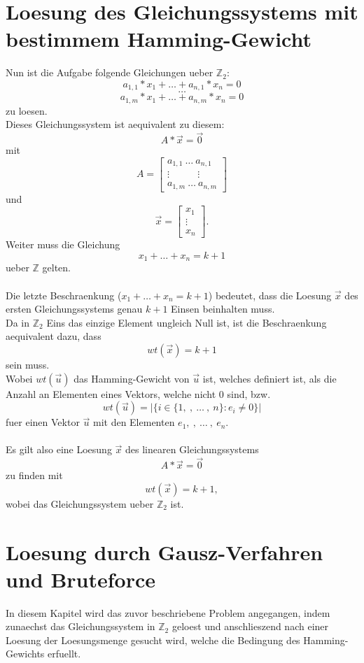 \documentclass[a4paper,10pt,ngerman]{scrartcl}
\begin{document}
\section{Loesung des Gleichungssystems mit bestimmem Hamming-Gewicht}
Nun ist die Aufgabe folgende Gleichungen ueber \(\mathbb{Z}_{2}\):
\[a_{1, 1} * x_1 + \dots + a_{n, 1} * x_n = 0\]
\[\dots\]
\[a_{1, m} * x_1 + \dots + a_{n, m}  * x_n = 0\]
zu loesen.\\
Dieses Gleichungssystem ist aequivalent zu diesem:
\[A * \vec{x} = \vec{0}\]
mit
\[A = \begin{bmatrix}
           a_{1, 1} \ \dots \ a_{n, 1} \\
           \vdots \ \ \ \ \ \ \ \ \ \ \ \ \ \vdots \\
           a_{1, m} \ \dots \ a_{n, m}
         \end{bmatrix} 
\] 
und
\[\vec{x} = \begin{bmatrix}
           x_{1} \\
           \vdots \\
           x_{n}
         \end{bmatrix} .
\]
Weiter muss die Gleichung
\[x_1 + \dots + x_n = k + 1\]
ueber \(\mathbb{Z}\) gelten.\\
\\
Die letzte Beschraenkung ($x_1 + \dots + x_n = k + 1$) bedeutet, dass die Loesung $\vec{x}$ des ersten Gleichungssystems genau $k+1$ Einsen beinhalten muss.\\
Da in $\mathbb{Z}_{2}$ Eins das einzige Element ungleich Null ist, ist die Beschraenkung aequivalent dazu, dass \\
$$
wt(\vec{x}) = k + 1
$$
sein muss.\\
Wobei $wt(\vec{u})$ das Hamming-Gewicht von $\vec{u}$ ist, welches definiert ist, als die Anzahl an Elementen eines Vektors, welche nicht $0$ sind, bzw.
$$
wt(\vec{u}) = | \{ i \in \{ 1, \ , \ \dots \ , \ n \} : e_i \not= 0 \} |
$$
fuer einen Vektor $\vec{u}$ mit den Elementen $e_1, \ , \ \dots \ , \ e_n$.
\\\\
Es gilt also eine Loesung $\vec{x}$ des linearen Gleichungssystems
\[A * \vec{x} = \vec{0}\]
zu finden mit
$$
wt(\vec{x}) = k + 1, 
$$
wobei das Gleichungssystem ueber \(\mathbb{Z}_{2}\) ist.

\section{Loesung durch Gausz-Verfahren und Bruteforce}
In diesem Kapitel wird das zuvor beschriebene Problem angegangen, indem zunaechst das Gleichungssystem in \(\mathbb{Z}_{2}\) geloest und anschlieszend nach einer Loesung der Loesungsmenge gesucht wird, welche die Bedingung des Hamming-Gewichts erfuellt.
\end{document}
